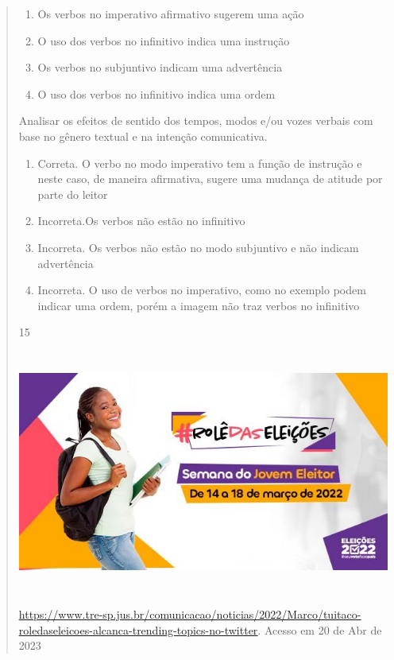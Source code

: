 {\begin{quote}
{\begin{itemize}
\begin{itemize}
\begin{enumerate}

\item
  Os verbos no imperativo afirmativo sugerem uma ação
\item
  O uso dos verbos no infinitivo indica uma instrução
\item
  Os verbos no subjuntivo indicam uma advertência
\item
  O uso dos verbos no infinitivo indica uma ordem
\end{enumerate}

Analisar os efeitos de sentido dos tempos, modos e/ou vozes verbais com
base no gênero textual e na intenção comunicativa.

\begin{enumerate}
\def\labelenumi{\arabic{enumi}.}
\item
  Correta. O verbo no modo imperativo tem a função de instrução e neste
  caso, de maneira afirmativa, sugere uma mudança de atitude por parte
  do leitor
\item
  Incorreta.Os verbos não estão no infinitivo
\item
  Incorreta. Os verbos não estão no modo subjuntivo e não indicam
  advertência
\item
  Incorreta. O uso de verbos no imperativo, como no exemplo podem
  indicar uma ordem, porém a imagem não traz verbos no infinitivo
\end{enumerate}

\num{15}

\includegraphics[width=5.90551in,height=3.15278in]{./imgSAEB_7_POR/media/image20.png}

\href{https://www.tre-sp.jus.br/comunicacao/noticias/2022/Marco/tuitaco-roledaseleicoes-alcanca-trending-topics-no-twitter}{\uline{https://www.tre-sp.jus.br/comunicacao/noticias/2022/Marco/tuitaco-roledaseleicoes-alcanca-trending-topics-no-twitter}}.
Acesso em 20 de Abr de 2023


\end{itemize}
\end{itemize}}
\end{quote}}
